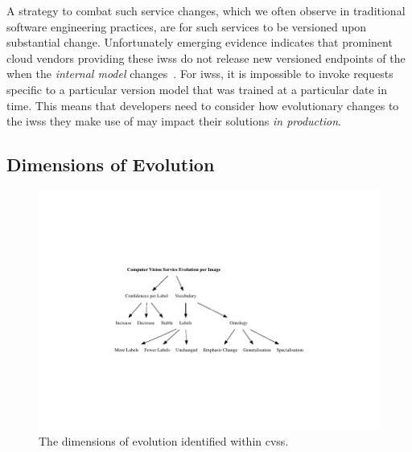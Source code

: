 A strategy to combat such service changes, which we often observe in traditional software engineering practices, are for such services to be versioned upon substantial change. Unfortunately emerging evidence indicates that prominent cloud vendors providing these \glspl{iws} do not release new versioned endpoints of the  when the \textit{internal model} changes~\citep{Cummaudo:2019icsme}. For \glspl{iws}, it is impossible to invoke requests specific to a particular version model that was trained at a particular date in time.  This means that developers need to consider how evolutionary changes to the \glspl{iws} they make use of may impact their solutions \textit{in production}. 


\subsection{Dimensions of Evolution}


\begin{figure}
    \centering
    \includegraphics[width=\linewidth]{service-evolution}
    \caption[Dimensions of evolution within computer vision services]{The dimensions of evolution identified within \glspl{cvs}.}
    \label{fig:service-evolution}
\end{figure}

